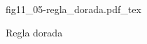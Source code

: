 \begin{figure}[h]
\centering
\def\svgwidth{0.5\textwidth}
{fig11_05-regla_dorada.pdf_tex}
\caption{Regla dorada}
\label{fig11_05-regla_dorada}
\end{figure}